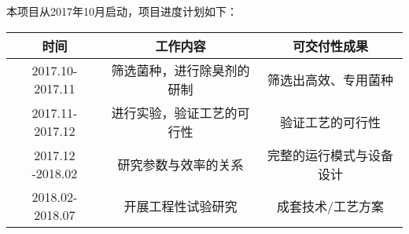本项目从2017年10月启动，项目进度计划如下：\par
\begin{tabular}{|c|c|c|}
\hline
时间 & 工作内容 & 可交付性成果\\
\hline
2017.10-2017.11 & 筛选菌种，进行除臭剂的研制 & 筛选出高效、专用菌种\\
\hline
2017.11-2017.12 & 进行实验，验证工艺的可行性 & 验证工艺的可行性\\
\hline
2017.12 -2018.02 & 研究参数与效率的关系 & 完整的运行模式与设备设计\\
\hline
2018.02-2018.07 & 开展工程性试验研究 & 成套技术/工艺方案\\
\hline
\end{tabular}
\par
